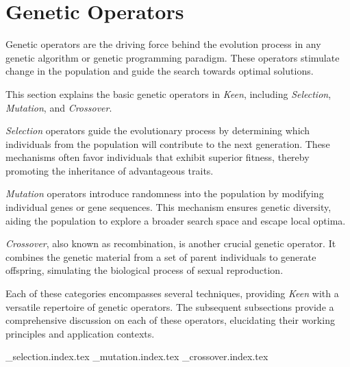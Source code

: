 
\section{Genetic Operators}
\label{sec:keen:operators}
  Genetic operators are the driving force behind the evolution process in any
  genetic algorithm or genetic programming paradigm.
  These operators stimulate change in the population and guide the search
  towards optimal solutions.
  

  This section explains the basic genetic operators in \textit{Keen}, including \textit{Selection}, \textit{Mutation}, and \textit{Crossover}.

  \textit{Selection} operators guide the evolutionary process by determining
  which individuals from the population will contribute to the next generation.
  These mechanisms often favor individuals that exhibit superior fitness, 
  thereby promoting the inheritance of advantageous traits.

  \textit{Mutation} operators introduce randomness into the population by 
  modifying individual genes or gene sequences.
  This mechanism ensures genetic diversity, aiding the population to explore a 
  broader search space and escape local optima.

  \textit{Crossover}, also known as recombination, is another crucial genetic 
  operator.
  It combines the genetic material from a set of parent individuals to generate
  offspring, simulating the biological process of sexual reproduction.

  Each of these categories encompasses several techniques, providing
  \textit{Keen} with a versatile repertoire of genetic operators.
  The subsequent subsections provide a comprehensive discussion on each of these
  operators, elucidating their working principles and application contexts.

  {_selection.index.tex}
  {_mutation.index.tex}
  {_crossover.index.tex}
